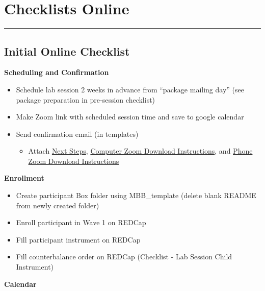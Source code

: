 \documentclass[]{book}
\providecommand{\tightlist}{%
  \setlength{\itemsep}{0pt}\setlength{\parskip}{0pt}}
\begin{document}
\hypertarget{checklists-online}{%
\section{Checklists Online}\label{checklists-online}}

\begin{center}\rule{0.5\linewidth}{0.5pt}\end{center}

\hypertarget{initial-online-checklist}{%
\subsection{Initial Online Checklist}\label{initial-online-checklist}}

\textbf{Scheduling and Confirmation}

\begin{itemize}
\tightlist
\item
  Schedule lab session 2 weeks in advance from ``package mailing day'' (see package preparation in pre-session checklist)
\item
  Make Zoom link with scheduled session time and save to google calendar
\item
  Send confirmation email (in templates)

  \begin{itemize}
  \tightlist
  \item
    Attach \href{https://ucla.app.box.com/file/665452959932}{Next Steps}, \href{https://ucla.app.box.com/file/680632734387}{Computer Zoom Download Instructions}, and \href{https://ucla.app.box.com/file/680631353662}{Phone Zoom Download Instructions}
  \end{itemize}
\end{itemize}

\textbf{Enrollment}

\begin{itemize}
\tightlist
\item
  Create participant Box folder using MBB\_template (delete blank README from newly created folder)
\item
  Enroll participant in Wave 1 on REDCap
\item
  Fill participant instrument on REDCap
\item
  Fill counterbalance order on REDCap (Checklist - Lab Session Child Instrument)
\end{itemize}

\textbf{Calendar}
\end{document}
